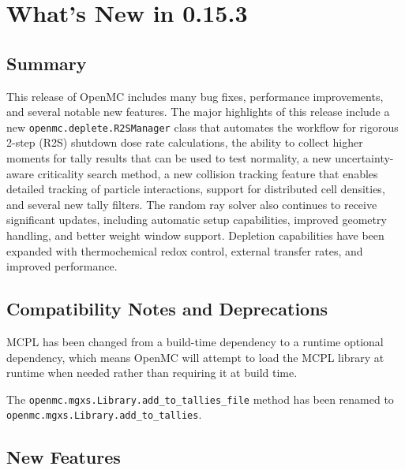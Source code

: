 \section{What's New in 0.15.3}

\subsection*{Summary}

This release of OpenMC includes many bug fixes, performance improvements, and
several notable new features. The major highlights of this release include a new
\texttt{openmc.deplete.R2SManager} class that automates the workflow for
rigorous 2-step (R2S) shutdown dose rate calculations, the ability to collect
higher moments for tally results that can be used to test normality, a new
uncertainty-aware criticality search method, a new collision tracking feature
that enables detailed tracking of particle interactions, support for distributed
cell densities, and several new tally filters. The random ray solver also
continues to receive significant updates, including automatic setup
capabilities, improved geometry handling, and better weight window support.
Depletion capabilities have been expanded with thermochemical redox control,
external transfer rates, and improved performance.

\subsection*{Compatibility Notes and Deprecations}

MCPL has been changed from a build-time dependency to a runtime optional
dependency, which means OpenMC will attempt to load the MCPL library at
runtime when needed rather than requiring it at build time.

The \texttt{openmc.mgxs.Library.add\_to\_tallies\_file} method has been renamed to\newline
\texttt{openmc.mgxs.Library.add\_to\_tallies}.

\subsection*{New Features}

